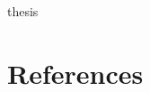 \documentclass[11pt,a4paper]{report}
\begin{document}
\cleardoublepage

% 

\begin{btSect}{thesis} %
\section*{References}
\btPrintCited
\end{btSect}








% 





% 



\end{document}
